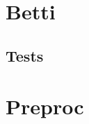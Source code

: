 \documentclass[11pt,a4paper,twoside]{report}
\begin{document}
\section{Betti}


\newpage





\newpage

\subsection{Tests}




\newpage
\section{Preproc}


\end{document}
